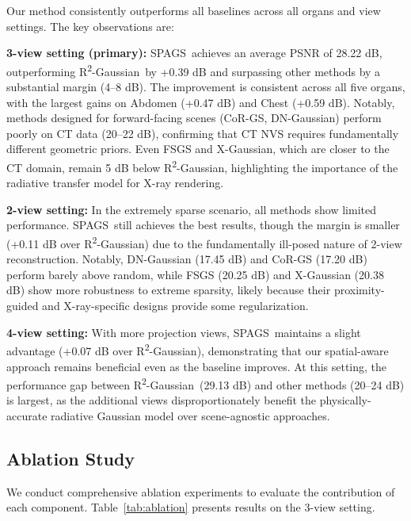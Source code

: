 \documentclass{egPublStyle}
\newcommand{\spags}{SPAGS}
\newcommand{\rtwo}{R\textsuperscript{2}-Gaussian}
\begin{document}
Our method consistently outperforms all baselines across all organs and view settings. The key observations are:

\textbf{3-view setting (primary):} \spags\ achieves an average PSNR of 28.22 dB, outperforming \rtwo\ by +0.39 dB and surpassing other methods by a substantial margin (4--8 dB). The improvement is consistent across all five organs, with the largest gains on Abdomen (+0.47 dB) and Chest (+0.59 dB). Notably, methods designed for forward-facing scenes (CoR-GS, DN-Gaussian) perform poorly on CT data (20--22 dB), confirming that CT NVS requires fundamentally different geometric priors. Even FSGS and X-Gaussian, which are closer to the CT domain, remain 5 dB below \rtwo, highlighting the importance of the radiative transfer model for X-ray rendering.

\textbf{2-view setting:} In the extremely sparse scenario, all methods show limited performance. \spags\ still achieves the best results, though the margin is smaller (+0.11 dB over \rtwo) due to the fundamentally ill-posed nature of 2-view reconstruction. Notably, DN-Gaussian (17.45 dB) and CoR-GS (17.20 dB) perform barely above random, while FSGS (20.25 dB) and X-Gaussian (20.38 dB) show more robustness to extreme sparsity, likely because their proximity-guided and X-ray-specific designs provide some regularization.

\textbf{4-view setting:} With more projection views, \spags\ maintains a slight advantage (+0.07 dB over \rtwo), demonstrating that our spatial-aware approach remains beneficial even as the baseline improves. At this setting, the performance gap between \rtwo\ (29.13 dB) and other methods (20--24 dB) is largest, as the additional views disproportionately benefit the physically-accurate radiative Gaussian model over scene-agnostic approaches.

\subsection{Ablation Study}
\label{sec:ablation}

We conduct comprehensive ablation experiments to evaluate the contribution of each component. Table~\ref{tab:ablation} presents results on the 3-view setting.
\end{document}
